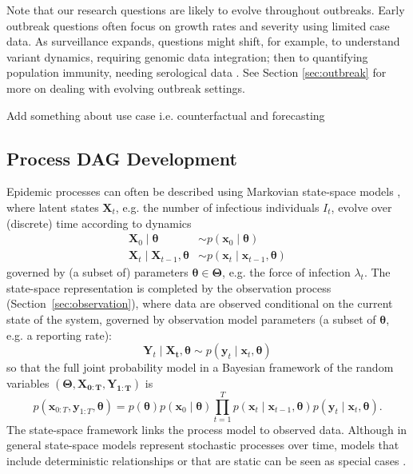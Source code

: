 \documentclass{article}
\begin{document}
Note that our research questions are likely to evolve throughout outbreaks. Early outbreak questions often focus on growth rates and severity using limited case data. As surveillance expands, questions might shift, for example, to understand variant dynamics, requiring genomic data integration; then to quantifying population immunity, needing serological data \citep{bhatia2023lessons,shearer2024opportunities}. See Section \ref{sec:outbreak} for more on dealing with evolving outbreak settings.

Add something about use case i.e. counterfactual and forecasting

\subsection{Process DAG Development} \label{sec:process}

Epidemic processes can often be described using Markovian state-space models \citep{birrell2018evidence}, where latent states $\boldsymbol{X}_t$, e.g. the number of infectious individuals $I_t$, evolve over (discrete) time according to dynamics 
\begin{align*}
\boldsymbol{X}_{0} \mid \boldsymbol{\theta} & \sim p(\boldsymbol{x}_0 \mid \boldsymbol{\theta}) \\
\boldsymbol{X}_{t} \mid \boldsymbol{X}_{t-1}, \boldsymbol{\theta} & \sim p(\boldsymbol{x}_t \mid \boldsymbol{x}_{t-1}, \boldsymbol{\theta})
\end{align*}
governed by (a subset of) parameters $\boldsymbol{\theta} \in \boldsymbol{\Theta}$, e.g. the force of infection $\lambda_t$. The state-space representation is completed by the observation process (Section~\ref{sec:observation}), where data are observed conditional on the current state of the system, governed by observation model parameters (a subset of $\boldsymbol{\theta}$, e.g. a reporting rate):
$$
\boldsymbol{Y}_{t} \mid \boldsymbol{X_t}, \boldsymbol{\theta} \sim p(\boldsymbol{y}_t \mid \boldsymbol{x}_t, \boldsymbol{\theta}) 
$$
so that the full joint probability model in a Bayesian framework of the random variables $(\boldsymbol{\Theta}, \boldsymbol{X_{0:T}}
, \boldsymbol{Y_{1:T}})$ is
$$
p(\boldsymbol{x}_{0:T}, \boldsymbol{y}_{1:T} , \boldsymbol{\theta}) = p(\boldsymbol{\theta})p(\boldsymbol{x}_0 \mid \boldsymbol{\theta})\prod_{t=1}^T p(\boldsymbol{x}_t \mid \boldsymbol{x}_{t-1}, \boldsymbol{\theta})p(\boldsymbol{y}_t \mid \boldsymbol{x}_t, \boldsymbol{\theta}).
$$
The state-space framework links the process model to observed data. Although in general state-space models represent stochastic processes over time, models that include deterministic relationships or that are static can be seen as special cases \citep{birrell2018evidence}. 
\end{document}
